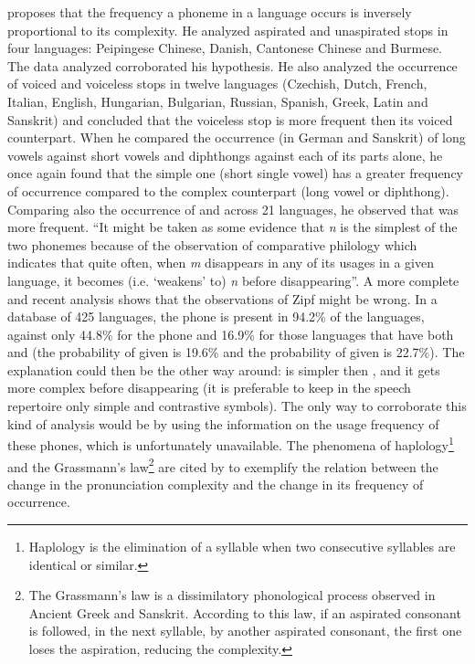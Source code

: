 \cite{zipf1949} proposes that the frequency a phoneme in a language occurs is inversely proportional to its complexity. He analyzed aspirated and unaspirated stops in four languages: Peipingese Chinese, Danish, Cantonese Chinese and Burmese. The data analyzed corroborated his hypothesis. He also analyzed the occurrence of voiced and voiceless stops in twelve languages (Czechish, Dutch, French, Italian, English, Hungarian, Bulgarian, Russian, Spanish, Greek, Latin and Sanskrit) and concluded that the voiceless stop is more frequent then its voiced counterpart. When he compared the occurrence (in German and Sanskrit) of long vowels against short vowels and diphthongs against each of its parts alone, he once again found that the simple one (short single vowel) has a greater frequency of occurrence compared to the complex counterpart (long vowel or diphthong). Comparing also the occurrence of \textipa{[m]} and \textipa{[n]} across 21 languages, he observed that \textipa{[n]} was more frequent. ``It might be taken as some evidence that \textit{n} is the simplest of the two phonemes because of the observation of comparative philology which indicates that quite often, when \textit{m} disappears in any of its usages in a given language, it becomes (i.e. `weakens' to) \textit{n} before disappearing''\citep{zipf1949}. A more complete and recent analysis \citep{maddieson1884} shows that the observations of Zipf might be wrong. In a database of 425 languages, the phone \textipa{[m]} is present in 94.2\% of the languages, against only 44.8\% for the phone \textipa{[n]} and 16.9\% for those languages that have both \textipa{[m]} and \textipa{[n]} (the probability of \textipa{[m]} given \textipa{[n]} is 19.6\% and the probability of \textipa{[n]} given \textipa{[m]} is 22.7\%). The explanation could then be the other way around: \textipa{[m]} is simpler then \textipa{[n]}, and it gets more complex before disappearing (it is preferable to keep in the speech repertoire only simple and contrastive symbols). The only way to corroborate this kind of analysis would be by using the information on the usage frequency of these phones, which is unfortunately unavailable. The phenomena of haplology\footnote{Haplology is the elimination of a syllable when two consecutive syllables are identical or similar.} and the Grassmann's law\footnote{The Grassmann's law is a dissimilatory phonological process observed in Ancient Greek and Sanskrit. According to this law, if an aspirated consonant is followed, in the next syllable, by another aspirated consonant, the first one loses the aspiration, reducing the complexity.} are cited by \cite{zipf1949} to exemplify the relation between the change in the pronunciation complexity  and the change in its frequency of occurrence.

